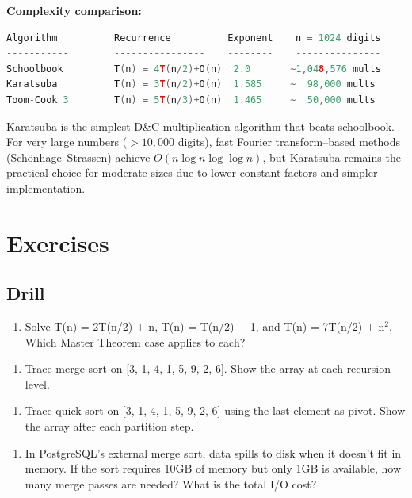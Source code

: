 \textbf{Complexity comparison:}

\begin{lstlisting}[language=C++]
Algorithm          Recurrence          Exponent    n = 1024 digits
-----------        ----------------    --------    ---------------
Schoolbook         T(n) = 4T(n/2)+O(n)  2.0       ~1,048,576 mults
Karatsuba          T(n) = 3T(n/2)+O(n)  1.585     ~  98,000 mults
Toom-Cook 3        T(n) = 5T(n/3)+O(n)  1.465     ~  50,000 mults
\end{lstlisting}

Karatsuba is the simplest D\&C multiplication algorithm that beats schoolbook. For very large numbers ($> 10{,}000$ digits), fast Fourier transform--based methods (Sch\"{o}nhage--Strassen) achieve $O(n \log n \log \log n)$, but Karatsuba remains the practical choice for moderate sizes due to lower constant factors and simpler implementation.

\section{Exercises}

\subsection{Drill}

\begin{enumerate}
\item Solve T(n) = 2T(n/2) + n, T(n) = T(n/2) + 1, and T(n) = 7T(n/2) + n$^{2}$. Which Master Theorem case applies to each?
\end{enumerate}

\begin{enumerate}
\item Trace merge sort on [3, 1, 4, 1, 5, 9, 2, 6]. Show the array at each recursion level.
\end{enumerate}

\begin{enumerate}
\item Trace quick sort on [3, 1, 4, 1, 5, 9, 2, 6] using the last element as pivot. Show the array after each partition step.
\end{enumerate}

\begin{enumerate}
\item In PostgreSQL's external merge sort, data spills to disk when it doesn't fit in memory. If the sort requires 10GB of memory but only 1GB is available, how many merge passes are needed? What is the total I/O cost?
\end{enumerate}

